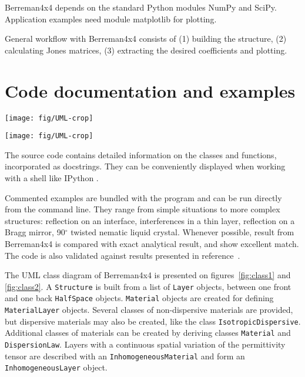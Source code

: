 Berreman4x4 depends on the standard Python modules NumPy\cite{NumPy} and SciPy\cite{SciPy}.
Application examples need module matplotlib\cite{matplotlib} for plotting.

General workflow with Berreman4x4 consists of  
(1) building the structure, 
(2) calculating Jones matrices, 
(3) extracting the desired coefficients and plotting.

\section{Code documentation and examples}

\begin{figure*}
\texttt{[image: fig/UML-crop]}
\caption{\label{fig:class1}Class diagram of Berreman4x4: structure, materials, and module functions. }
\end{figure*}

\begin{figure*}
\texttt{[image: fig/UML-crop]}
\caption{\label{fig:class2}Class diagram of Berreman4x4: layers, inhomogeneous materials, and half-spaces.}
\end{figure*}

The source code contains detailed information on the classes and functions, incorporated as docstrings.
They can be conveniently displayed when working with a shell like IPython \cite{IPython}.

Commented examples are bundled with the program and can be run directly from the command line.
They range from simple situations to more complex structures: reflection on an interface, interferences in a thin layer, reflection on a Bragg mirror, 90$^\circ$ twisted nematic liquid crystal.
Whenever possible, result from Berreman4x4 is compared with exact analytical result, and show excellent match.
The code is also validated against results presented in reference~.

The UML class diagram of Berreman4x4 is presented on figures~\ref{fig:class1} and \ref{fig:class2}.
A \texttt{Structure} is built from a list of \texttt{Layer} objects, between one front and one back \texttt{HalfSpace} objects.
\texttt{Material} objects are created for defining \texttt{MaterialLayer} objects.
Several classes of non-dispersive materials are provided, but dispersive materials may also be created, like the class \texttt{IsotropicDispersive}.
Additional classes of materials can be created by deriving classes \texttt{Material} and \texttt{DispersionLaw}.
Layers with a continuous spatial variation of the permittivity tensor are described with an \texttt{InhomogeneousMaterial} and form an \texttt{InhomogeneousLayer} object.


